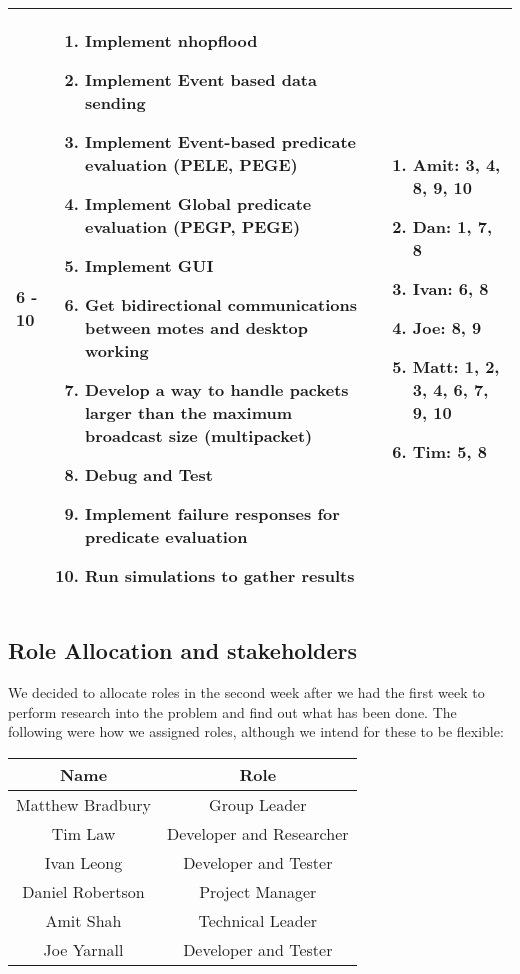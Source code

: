 \begin{center}
\begin{longtable}{| l | p{7.5cm} | p{5cm} |}
	6 - 10 & \begin{enumerate}
		\item Implement nhopflood
		\item Implement Event based data sending
		\item Implement Event-based predicate evaluation (PELE, PEGE)
		\item Implement Global predicate evaluation (PEGP, PEGE)
		\item Implement GUI
		\item Get bidirectional communications between motes and desktop working
		\item Develop a way to handle packets larger than the maximum broadcast size (multipacket)
		\item Debug and Test
		\item Implement failure responses for predicate evaluation
		\item Run simulations to gather results
		\end{enumerate} &
	\begin{enumerate}
		\item[] Amit: 3, 4, 8, 9, 10
		\item[] Dan: 1, 7, 8
		\item[] Ivan: 6, 8
		\item[] Joe: 8, 9
		\item[] Matt: 1, 2, 3, 4, 6, 7, 9, 10
		\item[] Tim: 5, 8
	\end{enumerate}
	\\ \hline
	
	\end{longtable}
\end{center}


\subsection{Role Allocation and stakeholders}

We decided to allocate roles in the second week after we had the first week to perform research into the problem and find out what has been done. The following were how we assigned roles, although we intend for these to be flexible:

\begin{table}[H]
\centering
	\begin{tabular}{| c | c |}
		\hline
		Name & Role\\
		\hline
		Matthew Bradbury & Group Leader\\
		Tim Law & Developer and Researcher\\
		Ivan Leong & Developer and Tester\\
		Daniel Robertson & Project Manager\\
		Amit Shah & Technical Leader\\
		Joe Yarnall & Developer and Tester\\
		\hline
	\end{tabular}
\end{table}

